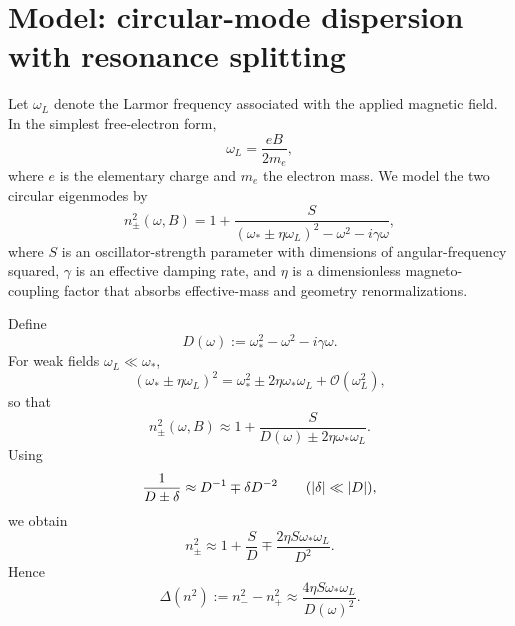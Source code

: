 \documentclass[11pt,a4paper]{article}
\begin{document}
    \section{Model: circular-mode dispersion with resonance splitting}
        
        Let \(\omega_L\) denote the Larmor frequency associated with the applied magnetic field. In the simplest free-electron form,
        \begin{equation}
            \omega_L=\frac{eB}{2m_e},
        \end{equation}
        where \(e\) is the elementary charge and \(m_e\) the electron mass. We model the two circular eigenmodes by
        \begin{equation}
            n_\pm^2(\omega,B)
            =
            1+\frac{S}{(\omega_\ast\pm \eta \omega_L)^2-\omega^2-i\gamma\omega},
            \label{eq:npm}
        \end{equation}
        where \(S\) is an oscillator-strength parameter with dimensions of angular-frequency squared, \(\gamma\) is an effective damping rate, and \(\eta\) is a dimensionless magneto-coupling factor that absorbs effective-mass and geometry renormalizations.
        
        Define
        \begin{equation}
            D(\omega):=\omega_\ast^2-\omega^2-i\gamma\omega.
        \end{equation}
        For weak fields \(\omega_L\ll \omega_\ast\),
        \begin{equation}
            (\omega_\ast\pm \eta\omega_L)^2
            =
            \omega_\ast^2\pm 2\eta\omega_\ast\omega_L+\mathcal{O}(\omega_L^2),
        \end{equation}
        so that
        \begin{equation}
            n_\pm^2(\omega,B)\approx 1+\frac{S}{D(\omega)\pm 2\eta\omega_\ast\omega_L}.
        \end{equation}
        Using
        \begin{equation}
            \frac{1}{D\pm \delta}\approx D^{-1}\mp \delta D^{-2}
            \qquad
            (\abs{\delta}\ll \abs{D}),
        \end{equation}
        we obtain
        \begin{equation}
            n_\pm^2
            \approx
            1+\frac{S}{D}
            \mp
            \frac{2\eta S\omega_\ast\omega_L}{D^2}.
            \label{eq:npm2lin}
        \end{equation}
        Hence
        \begin{equation}
            \Delta(n^2):=n_-^2-n_+^2
            \approx
            \frac{4\eta S\omega_\ast\omega_L}{D(\omega)^2}.
            \label{eq:Delta_n2}
        \end{equation}
        
\end{document}
